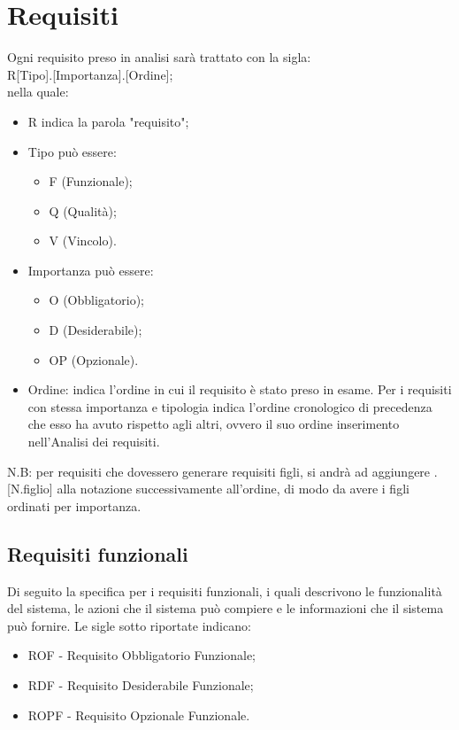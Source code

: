 \documentclass[10pt, a4paper]{article}
\begin{document}
\section{Requisiti}
Ogni requisito preso in analisi sarà trattato con la sigla:\\
R[Tipo].[Importanza].[Ordine];\\
nella quale:\\
\begin{itemize}
\item R indica la parola "requisito";
\item Tipo può essere:
    \begin{itemize}
	\item F (Funzionale);
	\item Q (Qualità);
	\item V (Vincolo).
    \end{itemize}
\item Importanza può essere:
    \begin{itemize}
        \item O (Obbligatorio);
	\item D (Desiderabile);
	\item OP (Opzionale).
    \end{itemize}
\item Ordine: indica l’ordine in cui il requisito è stato preso in esame. Per i requisiti con stessa importanza e tipologia indica l’ordine cronologico di precedenza che esso ha avuto rispetto agli altri, ovvero il suo ordine inserimento nell'Analisi dei requisiti.
\end{itemize}
N.B: per requisiti che dovessero generare requisiti figli, si andrà ad aggiungere .[N.figlio] alla notazione successivamente all’ordine, di modo da avere i figli ordinati per importanza.

\subsection{Requisiti funzionali}
Di seguito la specifica per i requisiti funzionali, i quali descrivono le funzionalità del sistema, le azioni
che il sistema può compiere e le informazioni che il sistema può fornire.
Le sigle sotto riportate indicano:
\begin{itemize}
    \item ROF - Requisito Obbligatorio Funzionale;
    \item RDF - Requisito Desiderabile Funzionale;
    \item ROPF - Requisito Opzionale Funzionale.
\end{itemize}
\end{document}
